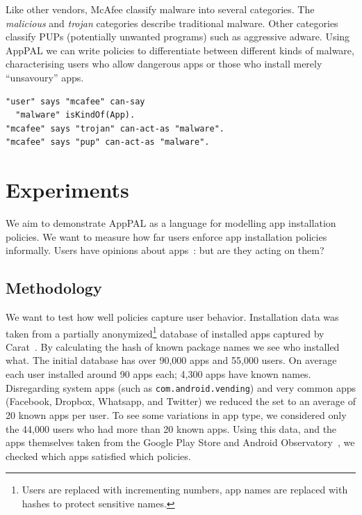 \documentclass[]{soups-poster}
\newcommand{\citep}[1]{\cite{#1}}
\begin{document}
Like other vendors, McAfee classify malware into several categories.
The \emph{malicious} and \emph{trojan} categories describe traditional malware.
Other categories classify PUPs (potentially unwanted programs) such as aggressive adware.
Using AppPAL we can write policies to differentiate between different kinds of malware,
characterising users who allow dangerous apps or those who install merely ``unsavoury'' apps.
\begin{lstlisting}
"user" says "mcafee" can-say
  "malware" isKindOf(App).
"mcafee" says "trojan" can-act-as "malware".
"mcafee" says "pup" can-act-as "malware".
\end{lstlisting}

%

\section{Experiments}

We aim to demonstrate AppPAL as a language for modelling app installation policies.
We want to measure how far users enforce app installation policies informally.
Users have opinions about apps~\citep{Sadeh:2014vq}: but are they acting on them?

\subsection{Methodology}

We want to test how well policies capture user behavior.
Installation data was taken from a partially anonymized\footnote{Users are replaced with incrementing numbers, app names are replaced with hashes to protect sensitive names.} database of installed apps captured by Carat~\citep{Oliner:2013ht}.
By calculating the hash of known package names we see who installed what.
%
The initial database has over 90,000 apps and 55,000 users.
On average each user installed around 90 apps each; 4,300 apps have known names.
Disregarding system apps (such as \texttt{com.android.vending}) and very common apps (Facebook, Dropbox, Whatsapp, and Twitter) we reduced the set to an average of 20 known apps per user.
To see some variations in app type, we considered only the 44,000 users who had more than 20 known apps.
Using this data, and the apps themselves taken from the Google Play Store and Android Observatory~\citep{Barrera:2012iba}, we checked which apps satisfied which policies.
\end{document}
